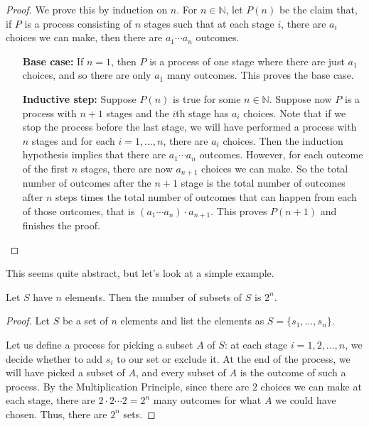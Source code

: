 \documentclass[11pt,dvipsnames]{book}
\numberwithin{equation}{section} %
\numberwithin{figure}{section} %
\numberwithin{table}{section} %
\begin{document}
\begin{proof}
We prove this by induction on $n$. For $n\in \mathbb{N}$, let $P(n)$ be the claim that, if $P$ is a process consisting of $n$ stages such that at each stage $i$, there are $a_{i}$ choices we can make, then there are $a_{1}\cdots a_{n}$ outcomes.
\begin{itemize}
\item[{\bf Base case:}] If $n=1$, then $P$ is a process of one stage where there are just $a_{1}$ choices, and so there are only $a_{1}$ many outcomes. This proves the base case. 
\item[{\bf Inductive step:}] Suppose $P(n)$ is true for some $n\in \mathbb{N}$. Suppose now $P$ is a process with $n+1$ stages and the $i$th stage has $a_{i}$ choices. Note that if we stop the process before the last stage, we will have performed a process with $n$ stages and for each $i=1, \dots ,n$, there are $a_{i}$ choices. Then the induction hypothesis implies that there are $a_{1}\cdots a_{n}$ outcomes. However, for each outcome of the first $n$ stages, there are now $a_{n+1}$ choices we can make. So the total number of outcomes after the $n+1$ stage is the total number of outcomes after $n$ steps times the total number of outcomes that can happen from each of those outcomes, that is $(a_{1}\cdots a_{n})\cdot a_{n+1}$. This proves $P(n+1)$ and finishes the proof. 
\end{itemize}
\end{proof}

This seems quite abstract, but let's look at a simple example. 



\begin{proposition}
\label{c:1}
Let $S$ have $n$ elements. Then the number of subsets of $S$ is $2^{n}$. 
\end{proposition}



\begin{proof}
Let $S$ be a set of $n$ elements and list the elements as $S=\{s_{1}, \dots ,s_{n}\}$.

Let us define a process for picking a subset $A$ of $S$: at each stage $i=1,2,\dots ,n$, we decide whether to add $s_{i}$ to our set or exclude it. At the end of the process, we will have picked a subset of $A$, and every subset of $A$ is the outcome of such a process. By the Multiplication Principle, since there are $2$ choices we can make at each stage, there are $2\cdot 2\cdots 2=2^{n}$ many outcomes for what $A$ we could have chosen. Thus, there are $2^{n}$ sets. 
\end{proof} 
\end{document}
